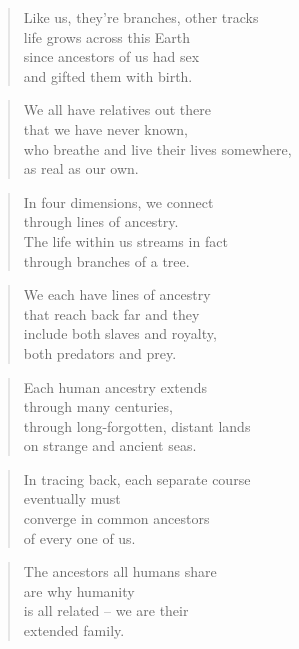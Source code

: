 \documentclass[14pt,a4paper]{article}
\begin{document}
\begin{verse}
Like us, they’re branches, other tracks\\
life grows across this Earth\\
since ancestors of us had sex\\
and gifted them with birth.
\end{verse}

\begin{verse}
We all have relatives out there\\
that we have never known,\\
who breathe and live their lives somewhere,\\
as real as our own.
\end{verse}

\begin{verse}
In four dimensions, we connect\\
through lines of ancestry.\\
The life within us streams in fact\\
through branches of a tree.
\end{verse}

\begin{verse}
We each have lines of ancestry\\
that reach back far and they\\
include both slaves and royalty,\\
both predators and prey.
\end{verse}

\begin{verse}
Each human ancestry extends\\
through many centuries,\\
through long-forgotten, distant lands\\
on strange and ancient seas.
\end{verse}

\begin{verse}
In tracing back, each separate course\\
eventually must\\
converge in common ancestors\\
of every one of us.
\end{verse}

\begin{verse}
The ancestors all humans share\\
are why humanity\\
is all related – we are their\\
extended family.
\end{verse}
\end{document}
